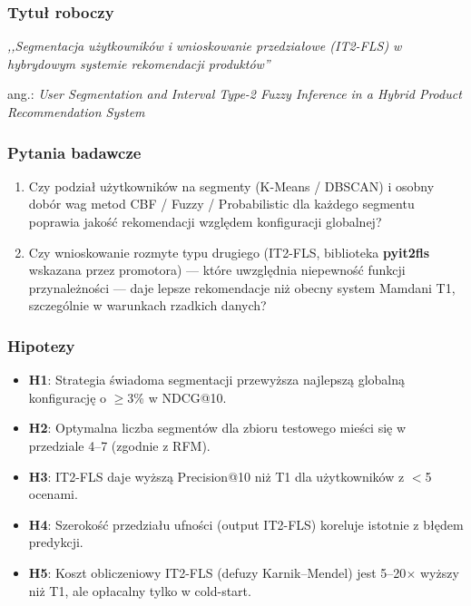 \documentclass[a4paper,11pt]{article}
\begin{document}
\subsubsection*{Tytuł roboczy}
\noindent\textit{,,Segmentacja użytkowników i wnioskowanie przedziałowe (IT2-FLS) w hybrydowym systemie rekomendacji produktów''}

\medskip\noindent ang.: \textit{User Segmentation and Interval Type-2 Fuzzy Inference in a Hybrid Product Recommendation System}

\subsubsection*{Pytania badawcze}

\begin{enumerate}[leftmargin=1.5em,itemsep=2pt]
  \item Czy podział użytkowników na segmenty (K-Means / DBSCAN) i osobny dobór wag metod CBF / Fuzzy / Probabilistic dla każdego segmentu poprawia jakość rekomendacji względem konfiguracji globalnej?
  \item Czy wnioskowanie rozmyte typu drugiego (IT2-FLS, biblioteka \textbf{pyit2fls} wskazana przez promotora) --- które uwzględnia niepewność funkcji przynależności --- daje lepsze rekomendacje niż obecny system Mamdani T1, szczególnie w warunkach rzadkich danych?
\end{enumerate}

\subsubsection*{Hipotezy}

\begin{itemize}[leftmargin=1.5em,itemsep=2pt]
  \item \textbf{H1}: Strategia świadoma segmentacji przewyższa najlepszą globalną konfigurację o $\geq$3\% w NDCG@10.
  \item \textbf{H2}: Optymalna liczba segmentów dla zbioru testowego mieści się w przedziale 4--7 (zgodnie z RFM).
  \item \textbf{H3}: IT2-FLS daje wyższą Precision@10 niż T1 dla użytkowników z $<$5 ocenami.
  \item \textbf{H4}: Szerokość przedziału ufności (output IT2-FLS) koreluje istotnie z błędem predykcji.
  \item \textbf{H5}: Koszt obliczeniowy IT2-FLS (defuzy Karnik--Mendel) jest 5--20$\times$ wyższy niż T1, ale opłacalny tylko w cold-start.
\end{itemize}
\end{document}
